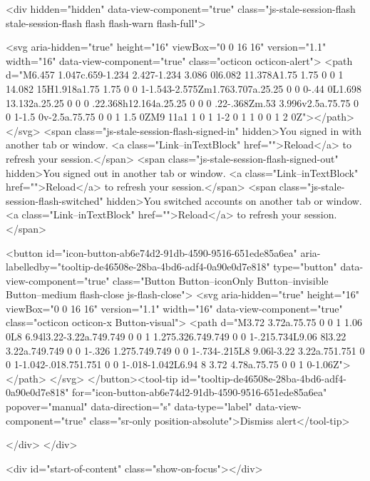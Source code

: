       <div hidden="hidden" data-view-component="true" class="js-stale-session-flash stale-session-flash flash flash-warn flash-full">
  
        <svg aria-hidden="true" height="16" viewBox="0 0 16 16" version="1.1" width="16" data-view-component="true" class="octicon octicon-alert">
    <path d="M6.457 1.047c.659-1.234 2.427-1.234 3.086 0l6.082 11.378A1.75 1.75 0 0 1 14.082 15H1.918a1.75 1.75 0 0 1-1.543-2.575Zm1.763.707a.25.25 0 0 0-.44 0L1.698 13.132a.25.25 0 0 0 .22.368h12.164a.25.25 0 0 0 .22-.368Zm.53 3.996v2.5a.75.75 0 0 1-1.5 0v-2.5a.75.75 0 0 1 1.5 0ZM9 11a1 1 0 1 1-2 0 1 1 0 0 1 2 0Z"></path>
</svg>
        <span class="js-stale-session-flash-signed-in" hidden>You signed in with another tab or window. <a class="Link--inTextBlock" href="">Reload</a> to refresh your session.</span>
        <span class="js-stale-session-flash-signed-out" hidden>You signed out in another tab or window. <a class="Link--inTextBlock" href="">Reload</a> to refresh your session.</span>
        <span class="js-stale-session-flash-switched" hidden>You switched accounts on another tab or window. <a class="Link--inTextBlock" href="">Reload</a> to refresh your session.</span>

    <button id="icon-button-ab6e74d2-91db-4590-9516-651ede85a6ea" aria-labelledby="tooltip-de46508e-28ba-4bd6-adf4-0a90e0d7e818" type="button" data-view-component="true" class="Button Button--iconOnly Button--invisible Button--medium flash-close js-flash-close">  <svg aria-hidden="true" height="16" viewBox="0 0 16 16" version="1.1" width="16" data-view-component="true" class="octicon octicon-x Button-visual">
    <path d="M3.72 3.72a.75.75 0 0 1 1.06 0L8 6.94l3.22-3.22a.749.749 0 0 1 1.275.326.749.749 0 0 1-.215.734L9.06 8l3.22 3.22a.749.749 0 0 1-.326 1.275.749.749 0 0 1-.734-.215L8 9.06l-3.22 3.22a.751.751 0 0 1-1.042-.018.751.751 0 0 1-.018-1.042L6.94 8 3.72 4.78a.75.75 0 0 1 0-1.06Z"></path>
</svg>
</button><tool-tip id="tooltip-de46508e-28ba-4bd6-adf4-0a90e0d7e818" for="icon-button-ab6e74d2-91db-4590-9516-651ede85a6ea" popover="manual" data-direction="s" data-type="label" data-view-component="true" class="sr-only position-absolute">Dismiss alert</tool-tip>


  
</div>
    </div>

  <div id="start-of-content" class="show-on-focus"></div>








